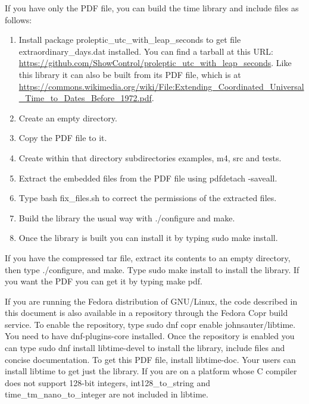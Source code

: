 \documentclass[letterpaper,twoside]{article}
\begin{document}
If you have only the PDF file, you can build the time library
and include files as follows:
\begin{enumerate}
\item Install package proleptic\_utc\_with\_leap\_seconds
  to get file {\ttfamily extraordinary\_days.dat} installed.
  You can find a tarball at this URL:
  \url{https://github.com/ShowControl/proleptic_utc_with_leap_seconds}.
  Like this library it can also be built from its PDF file, which is
  at \url{https://commons.wikimedia.org/wiki/File:Extending_Coordinated_Universal_Time_to_Dates_Before_1972.pdf}.
\item Create an empty directory.
\item Copy the PDF file to it.
\item Create within that directory subdirectories {\ttfamily examples},
{\ttfamily m4}, {\ttfamily src} and {\ttfamily tests}.
\item Extract the embedded files from the PDF file using pdfdetach -saveall.
\item Type {\ttfamily bash fix\_files.sh} to correct the permissions of
  the extracted files.
\item Build the library the usual way with {\ttfamily ./configure}
and {\ttfamily make}.
\item Once the library is built you can install it by typing
{\ttfamily sudo make install}.
\end{enumerate}

If you have the compressed tar file, extract its contents to an empty
directory, then type {\ttfamily ./configure},
and {\ttfamily make}.  Type {\ttfamily sudo make install} to
install the library.  If you want the PDF you can get it by
typing {\ttfamily make pdf}.

If you are running the Fedora distribution of GNU/Linux, the code
described in this document is also available in a repository
through the Fedora Copr build service.  To enable the repository,
type {\ttfamily sudo dnf copr enable johnsauter/libtime}.
You need to have dnf-plugins-core installed.
Once the repository is enabled you can type
{\ttfamily sudo dnf install libtime-devel} to install
the library, include files and concise documentation.
To get this PDF file, install {\ttfamily libtime-doc}.
Your users can install {\ttfamily libtime} to get just
the library.  If you are on a platform whose C compiler does
not support 128-bit integers, {\ttfamily int128\_to\_string}
and {\ttfamily time\_tm\_nano\_to\_integer} are not included
in libtime.
\end{document}
